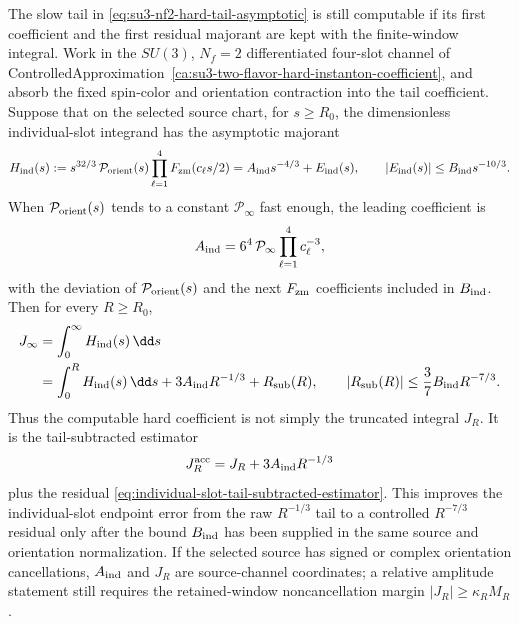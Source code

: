 \begin{proposition}
\label{prop:individual-slot-instanton-tail-subtraction}
The slow tail in
\eqref{eq:su3-nf2-hard-tail-asymptotic} is still computable if its first
coefficient and the first residual majorant are kept with the finite-window
integral.  Work in the \(SU(3)\), \(N_f=2\) differentiated four-slot channel
of
ControlledApproximation~\ref{ca:su3-two-flavor-hard-instanton-coefficient},
and absorb the fixed spin-color and orientation contraction into the tail
coefficient.  Suppose that on the selected source chart, for \(s\ge R_0\),
the dimensionless individual-slot integrand has the asymptotic majorant
\begin{equation}
  H_{\rm ind}(s)
  :=
  s^{32/3}\,
  \mathcal P_{\rm orient}(s)
  \prod_{\ell=1}^{4}F_{\rm zm}(c_\ell s/2)
  =
  A_{\rm ind}s^{-4/3}+E_{\rm ind}(s),
  \qquad
  |E_{\rm ind}(s)|\le B_{\rm ind}s^{-10/3}.
  \label{eq:individual-slot-hard-tail-majorant}
\end{equation}
When \(\mathcal P_{\rm orient}(s)\) tends to a constant
\(\mathcal P_\infty\) fast enough, the leading coefficient is
\[
  A_{\rm ind}
  =
  6^4\,\mathcal P_\infty
  \prod_{\ell=1}^{4}c_\ell^{-3},
\]
with the deviation of \(\mathcal P_{\rm orient}(s)\) and the next
\(F_{\rm zm}\) coefficients included in \(B_{\rm ind}\).  Then for every
\(R\ge R_0\),
\begin{equation}
\begin{aligned}
  J_\infty
  &=
  \int_0^\infty H_{\rm ind}(s)\,\dd s        \\
  &=
  \int_0^R H_{\rm ind}(s)\,\dd s
  +
  3A_{\rm ind}R^{-1/3}
  +
  R_{\rm sub}(R),
  \qquad
  |R_{\rm sub}(R)|
  \le
  \frac{3}{7}B_{\rm ind}R^{-7/3}.
\end{aligned}
  \label{eq:individual-slot-tail-subtracted-estimator}
\end{equation}
Thus the computable hard coefficient is not simply the truncated integral
\(J_R\).  It is the tail-subtracted estimator
\[
  J_R^{\rm acc}
  =
  J_R+3A_{\rm ind}R^{-1/3}
\]
plus the residual
\eqref{eq:individual-slot-tail-subtracted-estimator}.  This improves the
individual-slot endpoint error from the raw \(R^{-1/3}\) tail to a controlled
\(R^{-7/3}\) residual only after the bound \(B_{\rm ind}\) has been supplied
in the same source and orientation normalization.  If the selected source has
signed or complex orientation cancellations, \(A_{\rm ind}\) and \(J_R\) are
source-channel coordinates; a relative amplitude statement still requires the
retained-window noncancellation margin \(|J_R|\ge\kappa_R M_R\).
\end{proposition}

